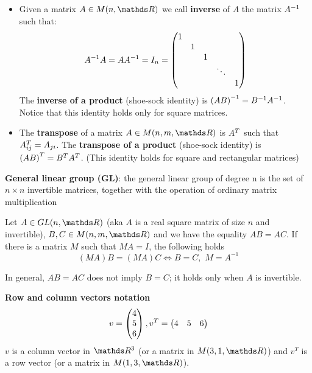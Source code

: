 \documentclass[computationalMathematics.tex]{subfiles}
\begin{document}
\begin{itemize}
     \item Given a matrix $A \in M(n, \R)$ we call \textbf{inverse} of $A$ the matrix ${A}^{-1}$ such that:
       \[  
       {A}^{-1} A = A {A}^{-1} = I_{n} =
         \begin{pmatrix}
                1\\
                & 1\\
                & & 1\\
                & & & \ddots\\
                & & & & 1
         \end{pmatrix}
         \]
         The \textbf{inverse of a product} (shoe-sock identity) is ${(A B)}^{-1} = {B}^{-1} {A}^{-1}$. Notice that this identity holds only for square matrices.

     \item The \textbf{transpose} of a matrix $A \in M(n, m, \R)$ is ${A}^{T}$ such that ${A}^{T}_{ij} = A_{ji}$. The \textbf{transpose of a product} (shoe-sock identity) is ${(A B)}^{T} = {B}^{T} {A}^{T}$. (This identity holds for square and rectangular matrices)

\end{itemize} 

\begin{definition}
  \textbf{General linear group (GL)}: the general linear group of degree n is the set of $n\times n$ invertible matrices, together with the operation of ordinary matrix multiplication
\end{definition}

\begin{proposition}
  Let $A \in GL(n, \R)$ (aka $A$ is a real square matrix of size $n$ and invertible), $B, C \in M(n, m, \R)$ and we have the equality $AB = AC$.
  If there is a matrix $M$ such that $MA = I$, the following holds
  \[
    (MA)B = (MA)C \Longleftrightarrow B=C, \,\, M = A^{-1}
  \]
\end{proposition}
\noindent
In general, $AB = AC$ does not imply $B = C$; it holds only when $A$ is invertible.

\begin{myframe}{\bf Row and column vectors notation}
  \[
    v = \begin{pmatrix}
        4\\
        5\\
        6
    \end{pmatrix}, \vspace{0.5cm}
    \tr{v} = \begin{pmatrix}
        4 & 5 & 6
    \end{pmatrix}
  \]
          $v$ is a column vector in $\R^3$ (or a matrix in $M(3, 1, \R)$) and $v^T$ is a row vector (or a matrix in $M(1, 3, \R)$).
\end{myframe}
\end{document}
